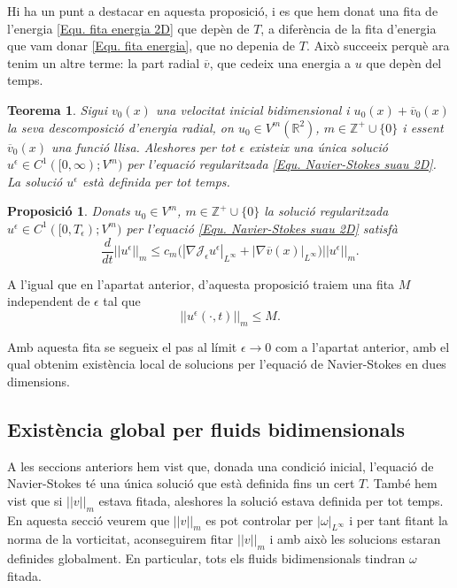 \documentclass{article}
\numberwithin{equation}{section}
\newtheorem{teorema}{Teorema}[section]
\newtheorem{proposicio}{Proposici\'{o}}[section]
\begin{document}
Hi ha un punt a destacar en aquesta proposici\'{o}, i es que hem donat una fita de l'energia \eqref{Equ. fita energia 2D} que dep\`{e}n de $T$, a difer\`{e}ncia de la fita d'energia que vam donar \eqref{Equ. fita energia}, que no depenia de $T$. Aix\`{o} succeeix perqu\`{e} ara tenim un altre terme: la part radial $\overline v$, que cedeix una energia a $u$ que dep\`{e}n del temps.

\begin{teorema}
Sigui $v_0(x)$ una velocitat inicial bidimensional i $u_0(x)+\overline v_0(x)$ la seva descomposici\'{o} d'energia radial, on $u_0\in V^m(\mathbb{R}^2)$, $m\in\mathbb{Z}^+\cup\{0\}$ i essent $\overline v_0(x)$ una funci\'{o} llisa. Aleshores per tot $\epsilon$ existeix  una \'{u}nica soluci\'{o} $u^{\epsilon}\in C^1([0,\infty);V^m)$ per l'equaci\'{o} regularitzada \eqref{Equ. Navier-Stokes suau 2D}. La soluci\'{o} $u^{\epsilon}$ est\`{a} definida per tot temps.
\end{teorema}

\begin{proposicio}
Donats $u_0\in V^m$, $m\in\mathbb{Z}^+\cup\{0\}$ la soluci\'{o} regularitzada $u^{\epsilon}\in C^1([0,T_{\epsilon});V^m)$ per l'equaci\'{o} \eqref{Equ. Navier-Stokes suau 2D} satisf\`{a}
\[\frac{d}{dt}||u^{\epsilon}||_m\leq c_m\big(|\nabla\mathcal{J}_{\epsilon}u^{\epsilon}|_{L^{\infty}}+|\nabla\overline v(x)|_{L^{\infty}}\big)||u^{\epsilon}||_m.\]
\end{proposicio}

A l'igual que en l'apartat anterior, d'aquesta proposici\'{o} traiem una fita $M$ independent de $\epsilon$ tal que
\[||u^{\epsilon}(\cdot,t)||_m\leq M.\]

Amb aquesta fita se segueix el pas al l\'{i}mit $\epsilon\to0$ com a l'apartat anterior, amb el qual obtenim exist\`{e}ncia local de solucions per l'equaci\'{o} de Navier-Stokes en dues dimensions.

\subsection{Exist\`{e}ncia global per fluids bidimensionals}\label{Sse: existencia global}

A les seccions anteriors hem vist que, donada una condici\'{o} inicial, l'equaci\'{o} de Navier-Stokes t\'{e} una \'{u}nica soluci\'{o} que est\`{a} definida fins un cert $T$. Tamb\'{e} hem vist que si $||v||_m$ estava fitada, aleshores la soluci\'{o} estava definida per tot temps. En aquesta secci\'{o} veurem que $||v||_m$ es pot controlar per $|\omega|_{L^{\infty}}$ i per tant fitant la norma de la vorticitat, aconseguirem fitar $||v||_m$ i amb aix\`{o} les solucions estaran definides globalment. En particular, tots els fluids bidimensionals tindran $\omega$ fitada.
\end{document}
